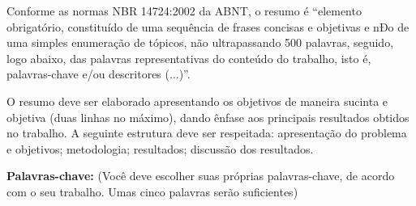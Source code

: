 %
%




\begin{resumo}

    Conforme as normas NBR 14724:2002 da ABNT, o resumo é ``elemento
    obrigatório,  constituído de  uma sequência  de frases  concisas e
    objetivas  e  nÐo  de  uma  simples  enumeração  de  tópicos,  não
    ultrapassando  500 palavras,  seguido, logo  abaixo,  das palavras
    representativas  do conteúdo do  trabalho, isto  é, palavras-chave
    e/ou descritores (...)''.

    O resumo deve ser elaborado apresentando os objetivos de
    maneira sucinta e objetiva (duas linhas no máximo), dando ênfase
    aos principais resultados obtidos no trabalho. A seguinte
    estrutura deve ser respeitada: apresentação do problema e
    objetivos; metodologia; resultados; discussão dos resultados.

\textbf{Palavras-chave:}
    (Você deve escolher suas próprias palavras-chave, de acordo com o
    seu trabalho. Umas cinco palavras serão suficientes)
	\palavrasChavesPortugues
\end{resumo}